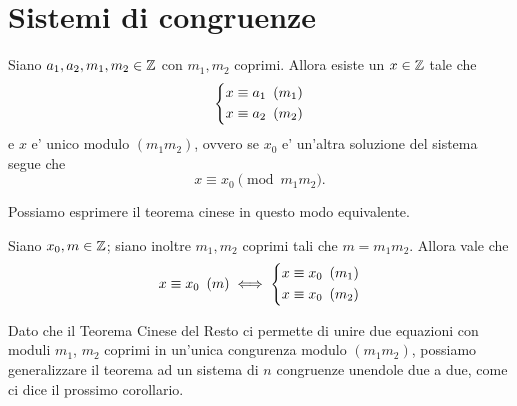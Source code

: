 \section{Sistemi di congruenze}

\begin{theorem}
     \label{th_cinese}
    Siano $a_1, a_2, m_1, m_2 \in \mathbb{Z}$ con $m_1, m_2$ coprimi. Allora esiste un $x \in \mathbb{Z}$ tale che
    \begin{equation*}
        \left\{
        \begin{alignedat}{1}
            x&\equiv a_1 \ \left(m_1\right)\\
            x&\equiv a_2 \ \left(m_2\right)
        \end{alignedat}      
        \right . 
    \end{equation*}
    e $x$ e' unico modulo $(m_1m_2)$, ovvero se $x_0$ e' un'altra soluzione del sistema segue che
    \begin{equation}
        x \equiv x_0 \pmod{m_1 m_2}.
    \end{equation} 
\end{theorem}

Possiamo esprimere il teorema cinese in questo modo equivalente.

\begin{theorem}
     \label{th_cinese_2}
    Siano $x_0, m \in \mathbb{Z}$; siano inoltre $m_1, m_2$ coprimi tali che $m = m_1m_2$. Allora vale che \begin{equation}
        x \equiv x_0 \ \left(m\right) \iff \left\{
            \begin{alignedat}{1}
                x&\equiv x_0 \ \left(m_1\right)\\
                x&\equiv x_0 \ \left(m_2\right)
            \end{alignedat}      
            \right .
    \end{equation}
\end{theorem}

Dato che il Teorema Cinese del Resto ci permette di unire due equazioni con moduli $m_1$, $m_2$ coprimi in un'unica congurenza modulo $(m_1m_2)$, possiamo generalizzare il teorema ad un sistema di $n$ congruenze unendole due a due, come ci dice il prossimo corollario.

